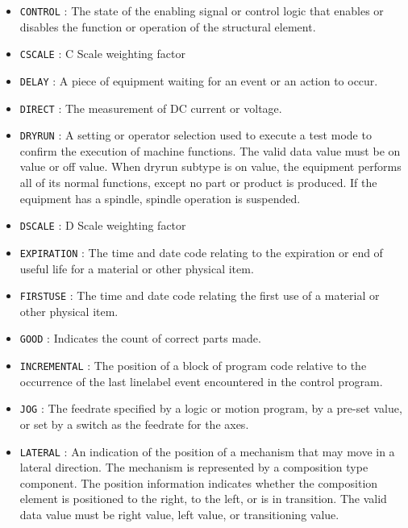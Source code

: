 \begin{itemize}
\item \texttt{CONTROL} : The state of the enabling signal or control logic that enables or disables the function or operation of the structural element. 

\item \texttt{C\textunderscore SCALE} : C Scale weighting factor 

\item \texttt{DELAY} : A piece of equipment waiting for an event or an action to occur. 

\item \texttt{DIRECT} : The measurement of DC current or voltage. 

\item \texttt{DRY\textunderscore RUN} : A setting or operator selection used to execute a test mode to confirm the execution of machine functions. 
 The valid data value must be on value or off value. 
 When dryrun subtype is on value, the equipment performs all of its normal functions, except no part or product is produced.  If the equipment has a spindle, spindle operation is suspended. 

\item \texttt{D\textunderscore SCALE} : D Scale weighting factor 

\item \texttt{EXPIRATION} : The time and date code relating to the expiration or end of useful life for a material or other physical item. 

\item \texttt{FIRST\textunderscore USE} : The time and date code relating the first use of a material or other physical item. 

\item \texttt{GOOD} : Indicates the count of correct parts made. 

\item \texttt{INCREMENTAL} : The position of a block of program code relative to the occurrence of the last linelabel event encountered in the control program. 

\item \texttt{JOG} : The feedrate specified by a logic or motion program, by a pre-set value, or set by a switch as the feedrate for the axes.  

\item \texttt{LATERAL} : An indication of the position of a mechanism that may move in a lateral direction.   The mechanism is represented by a composition type component. 
 The position information indicates whether the composition element is positioned to the right, to the left, or is in transition.  
 The valid data value must be right value, left value, or transitioning value. 


\end{itemize}
